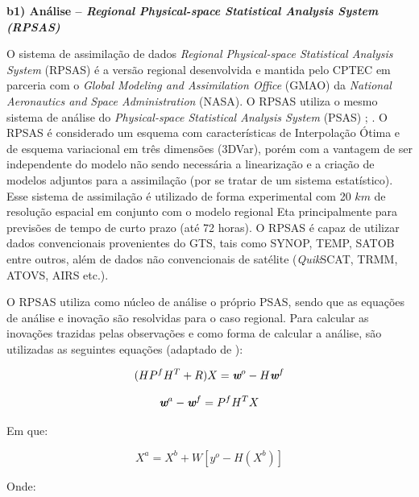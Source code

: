 \textbf{b1) Análise – \textit{Regional Physical-space Statistical Analysis System (RPSAS)}}

O sistema de assimilação de dados \textit{Regional Physical-space Statistical Analysis System} (RPSAS) é a versão regional desenvolvida e mantida pelo CPTEC em parceria com o \textit{Global Modeling and Assimilation Office} (GMAO) da \textit{National Aeronautics and Space Administration} (NASA). O RPSAS utiliza o mesmo sistema de análise do \textit{Physical-space Statistical Analysis System} (PSAS) \cite{dasilvaetal95}; \cite{cohnetal98}. O RPSAS é considerado um esquema com características de Interpolação Ótima e de esquema variacional em três dimensões (3DVar), porém com a vantagem de ser independente do modelo não sendo necessária a linearização e a criação de modelos adjuntos para a assimilação (por se tratar de um sistema estatístico). Esse sistema de assimilação é utilizado de forma experimental com 20 $km$ de resolução espacial em conjunto com o modelo regional Eta principalmente para previsões de tempo de curto prazo (até 72 horas). O RPSAS é capaz de utilizar dados convencionais provenientes do GTS, tais como SYNOP, TEMP, SATOB entre outros, além de dados não convencionais de satélite (\textit{Quik}SCAT, TRMM, ATOVS, AIRS etc.).

O RPSAS utiliza como núcleo de análise o próprio PSAS, sendo que as equações de análise e inovação são resolvidas para o caso regional. Para calcular as inovações trazidas pelas observações e como forma de calcular a análise, são utilizadas as seguintes equações (adaptado de ):

\begin{equation}
(HP^{f}H^{T}+R)X=\textit{\textbf{w}}^o-H\textit{\textbf{w}}^f
\label{form01}
\end{equation}

\begin{equation}
\textit{\textbf{w}}^a-\textit{\textbf{w}}^f=P^{f}H^{T}X
\label{form02}
\end{equation}

Em que:

\begin{equation}
X^{a}=X^{b}+W[y^{o}-H(X^{b})]
\label{form03}
\end{equation}

Onde:

